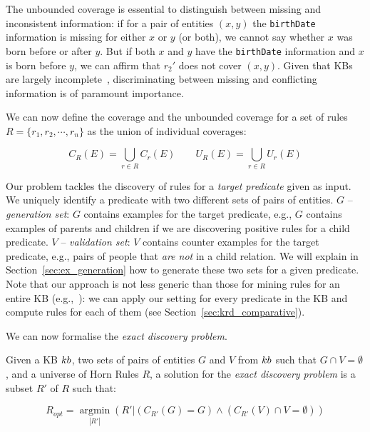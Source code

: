 \vspace{0.5ex}
The unbounded coverage is essential to distinguish between missing and inconsistent information: if for a pair of entities $(x,y)$ the \texttt{birthDate} information is missing for either $x$ or $y$ (or both), we cannot say whether $x$ was born before or after $y$. 
But if both $x$ and $y$ have the \texttt{birthDate} information and $x$ is born before $y$, we can affirm that $r_2'$ does not cover $(x,y)$. Given that KBs are largely incomplete~\cite{dong2014knowledge,min2013distant}, discriminating between missing and conflicting information is of paramount importance.

We can now define the coverage and the unbounded coverage for a set of rules $R=\{r_1,r_2,\cdots,r_n\}$ as the union of individual coverages:


\vspace{-4mm}	
	\begin{equation*}
C_R(E) = \bigcup \limits_{r \in R} C_r(E) \qquad U_R(E) = \bigcup \limits_{r \in R} U_r(E) 	\end{equation*}
\vspace{-2mm}

Our problem tackles the discovery of %
rules for a {\em target predicate} given as input. We uniquely identify a predicate with two different sets of pairs of entities.
$G$ -- \emph{generation set}: $G$ contains examples for the target predicate, e.g., $G$ contains examples of parents and children if we are discovering positive rules for a child predicate.
$V$ -- \emph{validation set}: $V$ contains counter examples for the target predicate, e.g., pairs of people that {\em are not} in a child relation.
We will explain in Section~\ref{sec:ex_generation} how to generate these two sets for a given predicate. Note that our approach is not less generic than those for mining rules for an entire KB (e.g.,~\cite{abedjan2014amending,galarraga2015fast}): 
we can apply our setting for every predicate in the KB and compute rules for each of them (see Section~\ref{sec:krd_comparative}).

We can now formalise the \emph{exact discovery problem}.
\begin{definition}
	Given a KB ${\sc kb}$, two sets of pairs of entities $G$ and $V$ from ${\sc kb}$ such that $G \cap V = \emptyset$, and a universe of Horn Rules $R$, a solution for the \emph{exact discovery problem} is a subset $R'$ of $R$  such that:

\vspace{-4mm}	
	\begin{equation*}
R_{opt}=\underset{|R'|}{\operatorname{argmin}}(R'|(C_{R'}(G) = G) \wedge (C_{R'}(V) \cap V = \emptyset) )	\end{equation*}

\end{definition}

